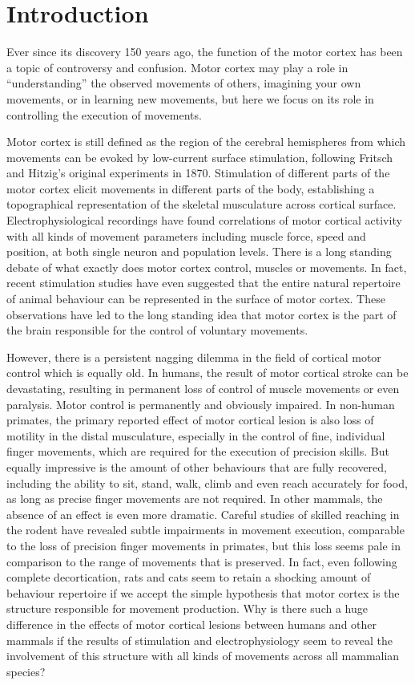 \section{Introduction}

Ever since its discovery 150 years ago, the function of the motor cortex has been a topic of controversy and confusion. Motor cortex may play a role in ``understanding'' the observed movements of others, imagining your own movements, or in learning new movements, but here we focus on its role in controlling the execution of movements.

Motor cortex is still defined as the region of the cerebral hemispheres from which movements can be evoked by low-current surface stimulation, following Fritsch and Hitzig's original experiments in 1870. Stimulation of different parts of the motor cortex elicit movements in different parts of the body, establishing a topographical representation of the skeletal musculature across cortical surface. Electrophysiological recordings have found correlations of motor cortical activity with all kinds of movement parameters including muscle force, speed and position, at both single neuron and population levels. There is a long standing debate of what exactly does motor cortex control, muscles or movements. In fact, recent stimulation studies have even suggested that the entire natural repertoire of animal behaviour can be represented in the surface of motor cortex. These observations have led to the long standing idea that motor cortex is the part of the brain responsible for the control of voluntary movements.

However, there is a persistent nagging dilemma in the field of cortical motor control which is equally old. In humans, the result of motor cortical stroke can be devastating, resulting in permanent loss of control of muscle movements or even paralysis. Motor control is permanently and obviously impaired. In non-human primates, the primary reported effect of motor cortical lesion is also loss of motility in the distal musculature, especially in the control of fine, individual finger movements, which are required for the execution of precision skills. But equally impressive is the amount of other behaviours that are fully recovered, including the ability to sit, stand, walk, climb and even reach accurately for food, as long as precise finger movements are not required. In other mammals, the absence of an effect is even more dramatic. Careful studies of skilled reaching in the rodent have revealed subtle impairments in movement execution, comparable to the loss of precision finger movements in primates, but this loss seems pale in comparison to the range of movements that is preserved. In fact, even following complete decortication, rats and cats seem to retain a shocking amount of behaviour repertoire if we accept the simple hypothesis that motor cortex is the structure responsible for movement production. Why is there such a huge difference in the effects of motor cortical lesions between humans and other mammals if the results of stimulation and electrophysiology seem to reveal the involvement of this structure with all kinds of movements across all mammalian species?

